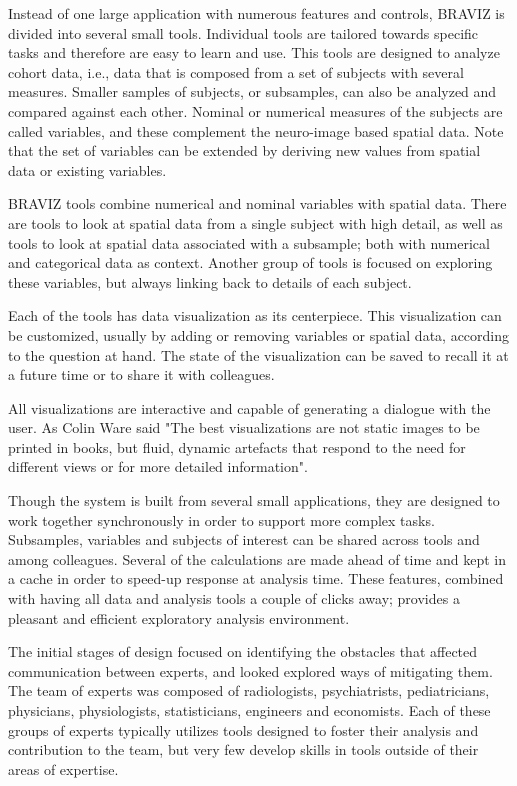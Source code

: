 \documentclass[utf8]{frontiersSCNS} %
\begin{document}
Instead of one large application with numerous features and controls, BRAVIZ is divided into several small tools. Individual tools are tailored towards specific tasks and therefore are easy to learn and use. This tools are designed to analyze cohort data, i.e., data that is composed from a set of subjects with several measures. Smaller samples of subjects, or subsamples, can also be analyzed and compared against each other. Nominal or numerical measures of the subjects are called variables, and these complement the neuro-image based spatial data. Note that the set of variables can be extended by deriving new values from spatial data or existing variables. 

BRAVIZ tools combine numerical and nominal variables with spatial data. There are tools to look at spatial data from a single subject with high detail, as well as tools to look at spatial data associated with a subsample; both with numerical and categorical data as context. Another group of tools is focused on exploring these variables, but always linking back to details of each subject.

Each of the tools has data visualization as its centerpiece. This visualization can be customized, usually by adding or removing variables or spatial data, according to the question at hand. The state of the visualization can be saved  to recall it at a future time or to share it with colleagues. 

All visualizations are interactive and capable of generating a dialogue with the user.
As Colin Ware \citep{ware_information_2004} said "The best visualizations are not static images to be printed in books, but fluid, dynamic artefacts that respond to the need for different views or for more detailed information".  

Though the system is built from several small applications, they are designed to work together synchronously in order to support more complex tasks. Subsamples, variables and subjects of interest can be shared across tools and among colleagues. 
Several of the calculations are made ahead of time and kept in a cache in order to speed-up response at analysis time. These features, combined with having all data and analysis tools a couple of clicks away; provides a pleasant and efficient exploratory analysis environment. 

The initial stages of design focused on identifying the obstacles that affected communication between experts, and looked explored ways of mitigating them. The team of experts was composed of radiologists, psychiatrists, pediatricians, physicians, physiologists, statisticians, engineers and economists. Each of these groups of experts typically utilizes tools designed to foster their analysis and contribution to the team, but very few develop skills in tools outside of their areas of expertise.
\end{document}
